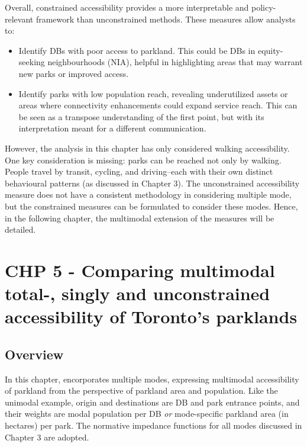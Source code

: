 \documentclass[
11pt, %
oneside, %
english, %
singlespacing, %
]{macthesis} %
\def\tightlist{}
\begin{document}
Overall, constrained accessibility provides a more interpretable and policy-relevant framework than unconstrained methods. These measures allow analysts to:

\begin{itemize}
\tightlist
\item
  Identify DBs with poor access to parkland. This could be DBs in equity-seeking neighbourhoods (NIA), helpful in highlighting areas that may warrant new parks or improved access.
\item
  Identify parks with low population reach, revealing underutilized assets or areas where connectivity enhancements could expand service reach. This can be seen as a transpose understanding of the first point, but with its interpretation meant for a different communication.
\end{itemize}

However, the analysis in this chapter has only considered walking accessibility. One key consideration is missing: parks can be reached not only by walking. People travel by transit, cycling, and driving--each with their own distinct behavioural patterns (as discussed in Chapter 3). The unconstrained accessibility measure does not have a consistent methodology in considering multiple mode, but the constrained measures can be formulated to consider these modes. Hence, in the following chapter, the multimodal extension of the measures will be detailed.

\chapter{CHP 5 - Comparing multimodal total-, singly and unconstrained accessibility of Toronto's parklands}\label{chp-5---comparing-multimodal-total--singly-and-unconstrained-accessibility-of-torontos-parklands}

\section{Overview}\label{overview-4}

In this chapter, encorporates multiple modes, expressing multimodal accessibility of parkland from the perspective of parkland area and population. Like the unimodal example, origin and destinations are DB and park entrance points, and their weights are modal population per DB \emph{or} mode-specific parkland area (in hectares) per park. The normative impedance functions for all modes discussed in Chapter 3 are adopted.
\end{document}
